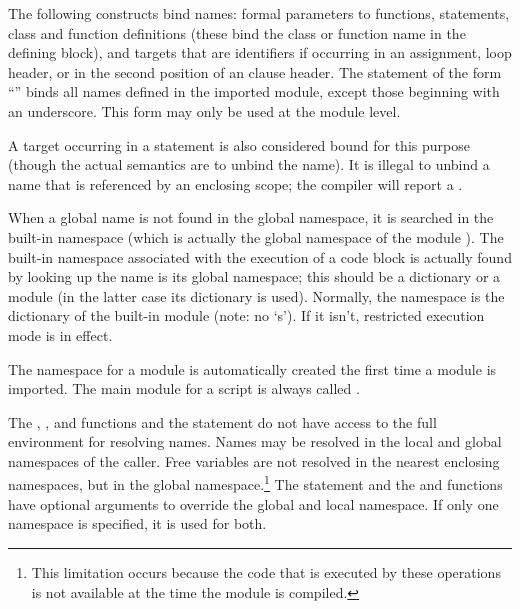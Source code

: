 The following constructs bind names: formal parameters to functions,
 statements, class and function definitions (these
bind the class or function name in the defining block), and targets
that are identifiers if occurring in an assignment,  loop
header, or in the second position of an  clause
header.  The  statement of the form ``'' binds all names defined in the imported module,
except those beginning with an underscore.  This form may only be used
at the module level.

A target occurring in a  statement is also considered bound
for this purpose (though the actual semantics are to unbind the
name).  It is illegal to unbind a name that is referenced by an
enclosing scope; the compiler will report a .

When a global name is not found in the global namespace, it is
searched in the built-in namespace (which is actually the global
namespace of the module ).  
The built-in namespace associated with the execution of a code block
is actually found by looking up the name  is its
global namespace; this should be a dictionary or a module (in the
latter case its dictionary is used).  Normally, the
 namespace is the dictionary of the built-in module
 (note: no `s').  If it isn't, restricted
execution mode is in effect.

The namespace for a module is automatically created the first time a
module is imported.  The main module for a script is always called
.

The , , and 
functions and the  statement do not have access to the
full environment for resolving names.  Names may be resolved in the
local and global namespaces of the caller.  Free variables are not
resolved in the nearest enclosing namespaces, but in the global
namespace.\footnote{This limitation occurs because the code that is
    executed by these operations is not available at the time the
    module is compiled.}
The  statement and the  and
 functions have optional arguments to override
the global and local namespace.  If only one namespace is specified,
it is used for both.

